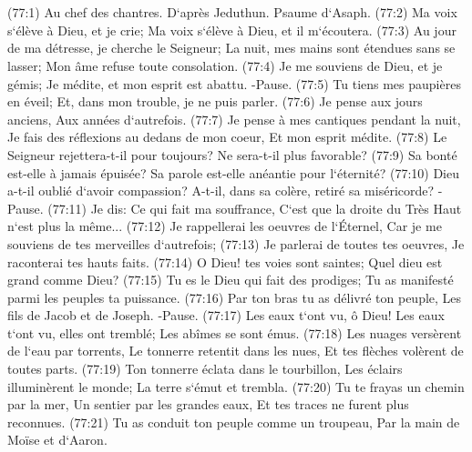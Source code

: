 \chapter{}

\verse (77:1) Au chef des chantres. D`après Jeduthun. Psaume d`Asaph. (77:2) Ma voix s`élève à Dieu, et je crie; Ma voix s`élève à Dieu, et il m`écoutera. 
\verse (77:3) Au jour de ma détresse, je cherche le Seigneur; La nuit, mes mains sont étendues sans se lasser; Mon âme refuse toute consolation. 
\verse (77:4) Je me souviens de Dieu, et je gémis; Je médite, et mon esprit est abattu. -Pause. 
\verse (77:5) Tu tiens mes paupières en éveil; Et, dans mon trouble, je ne puis parler. 
\verse (77:6) Je pense aux jours anciens, Aux années d`autrefois. 
\verse (77:7) Je pense à mes cantiques pendant la nuit, Je fais des réflexions au dedans de mon coeur, Et mon esprit médite. 
\verse (77:8) Le Seigneur rejettera-t-il pour toujours? Ne sera-t-il plus favorable? 
\verse (77:9) Sa bonté est-elle à jamais épuisée? Sa parole est-elle anéantie pour l`éternité? 
\verse (77:10) Dieu a-t-il oublié d`avoir compassion? A-t-il, dans sa colère, retiré sa miséricorde? -Pause. 
\verse (77:11) Je dis: Ce qui fait ma souffrance, C`est que la droite du Très Haut n`est plus la même... 
\verse (77:12) Je rappellerai les oeuvres de l`Éternel, Car je me souviens de tes merveilles d`autrefois; 
\verse (77:13) Je parlerai de toutes tes oeuvres, Je raconterai tes hauts faits. 
\verse (77:14) O Dieu! tes voies sont saintes; Quel dieu est grand comme Dieu? 
\verse (77:15) Tu es le Dieu qui fait des prodiges; Tu as manifesté parmi les peuples ta puissance. 
\verse (77:16) Par ton bras tu as délivré ton peuple, Les fils de Jacob et de Joseph. -Pause. 
\verse (77:17) Les eaux t`ont vu, ô Dieu! Les eaux t`ont vu, elles ont tremblé; Les abîmes se sont émus. 
\verse (77:18) Les nuages versèrent de l`eau par torrents, Le tonnerre retentit dans les nues, Et tes flèches volèrent de toutes parts. 
\verse (77:19) Ton tonnerre éclata dans le tourbillon, Les éclairs illuminèrent le monde; La terre s`émut et trembla. 
\verse (77:20) Tu te frayas un chemin par la mer, Un sentier par les grandes eaux, Et tes traces ne furent plus reconnues. 
\verse (77:21) Tu as conduit ton peuple comme un troupeau, Par la main de Moïse et d`Aaron. 

\chapter{}

